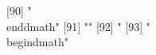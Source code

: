  [90] "\\end{dmath}"                                                                                                                                                                                                                                                                                                                                                                                                                                                                                                                                                                                                                                 
 [91] ""                                                                                                                                                                                                                                                                                                                                                                                                                                                                                                                                                                                                                                             
 [92] "%
 [93] "\\begin{dmath}"                                                                                                                                                                                                                                                                                                                                                                                                                                                                                                                                                                                                                               
